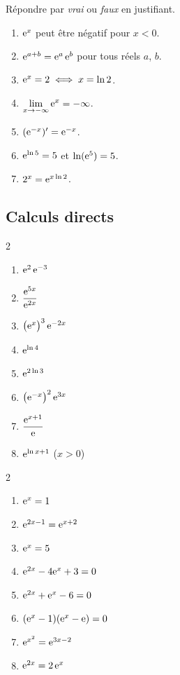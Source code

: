 Répondre par \emph{vrai} ou \emph{faux} en justifiant.
\begin{enumerate}
	\item $\mathrm{e}^{x}$ peut être négatif pour $x<0$.
	\item $\mathrm{e}^{a+b}=\mathrm{e}^{a}\,\mathrm{e}^{b}$ pour tous réels $a$, $b$.
	\item $\mathrm{e}^{x}=2\iff x=\ln 2$.
	\item $\displaystyle\lim_{x\to-\infty}\mathrm{e}^{x}=-\infty$.
	\item $(\mathrm{e}^{-x})'=\mathrm{e}^{-x}$.
	\item $\mathrm{e}^{\ln 5}=5$ et $\ln(\mathrm{e}^{5})=5$.
	\item $2^{x}=\mathrm{e}^{x\ln 2}$.
\end{enumerate}

\subsection{Calculs directs}

\begin{multicols}{2}
\begin{enumerate}
	\item $\mathrm{e}^{2}\,\mathrm{e}^{-3}$
	\item $\dfrac{\mathrm{e}^{5x}}{\mathrm{e}^{2x}}$
	\item $\bigl(\mathrm{e}^{x}\bigr)^{3}\,\mathrm{e}^{-2x}$
	\item $\mathrm{e}^{\ln 4}$
	\item $\mathrm{e}^{2\ln 3}$
	\item $\bigl(\mathrm{e}^{-x}\bigr)^{2}\,\mathrm{e}^{3x}$
	\item $\dfrac{\mathrm{e}^{x+1}}{\mathrm{e}}$
	\item $\mathrm{e}^{\ln x+1}$ \; ($x>0$)
\end{enumerate}
\end{multicols}

\begin{multicols}{2}
\begin{enumerate}
	\item $\mathrm{e}^{x}=1$
	\item $\mathrm{e}^{2x-1}=\mathrm{e}^{x+2}$
	\item $\mathrm{e}^{x}=5$
	\item $\mathrm{e}^{2x}-4\mathrm{e}^{x}+3=0$
	\item $\mathrm{e}^{2x}+\mathrm{e}^{x}-6=0$
	\item $(\mathrm{e}^{x}-1)(\mathrm{e}^{x}-\mathrm{e})=0$
	\item $\mathrm{e}^{x^{2}}=\mathrm{e}^{3x-2}$
	\item $\mathrm{e}^{2x}=2\,\mathrm{e}^{x}$
\end{enumerate}
\end{multicols}

